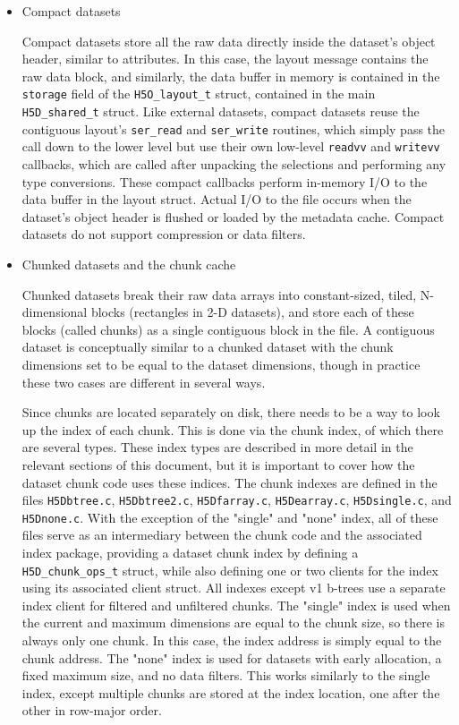 \begin{itemize}
    \item Compact datasets

Compact datasets store all the raw data directly inside the dataset's object header, similar to attributes. In this case, the layout message contains the raw data block, and similarly, the data buffer in memory is contained in the \texttt{storage} field of the \texttt{H5O\_layout\_t} struct, contained in the main \texttt{H5D\_shared\_t} struct. Like external datasets, compact datasets reuse the contiguous layout's \texttt{ser\_read} and \texttt{ser\_write} routines, which simply pass the call down to the lower level but use their own low-level \texttt{readvv} and \texttt{writevv} callbacks, which are called after unpacking the selections and performing any type conversions. These compact callbacks perform in-memory I/O to the data buffer in the layout struct. Actual I/O to the file occurs when the dataset's object header is flushed or loaded by the metadata cache. Compact datasets do not support compression or data filters.

    \item Chunked datasets and the chunk cache

Chunked datasets break their raw data arrays into constant-sized, tiled, N-dimensional blocks (rectangles in 2-D datasets), and store each of these blocks (called chunks) as a single contiguous block in the file. A contiguous dataset is conceptually similar to a chunked dataset with the chunk dimensions set to be equal to the dataset dimensions, though in practice these two cases are different in several ways.

Since chunks are located separately on disk, there needs to be a way to look up the index of each chunk. This is done via the chunk index, of which there are several types. These index types are described in more detail in the relevant sections of this document, but it is important to cover how the dataset chunk code uses these indices. The chunk indexes are defined in the files \texttt{H5Dbtree.c}, \texttt{H5Dbtree2.c}, \texttt{H5Dfarray.c}, \texttt{H5Dearray.c}, \texttt{H5Dsingle.c}, and \texttt{H5Dnone.c}. With the exception of the "single" and "none" index, all of these files serve as an intermediary between the chunk code and the associated index package, providing a dataset chunk index by defining a \texttt{H5D\_chunk\_ops\_t} struct, while also defining one or two clients for the index using its associated client struct. All indexes except v1 b-trees use a separate index client for filtered and unfiltered chunks. The "single" index is used when the current and maximum dimensions are equal to the chunk size, so there is always only one chunk. In this case, the index address is simply equal to the chunk address. The "none" index is used for datasets with early allocation, a fixed maximum size, and no data filters. This works similarly to the single index, except multiple chunks are stored at the index location, one after the other in row-major order.


\end{itemize}
